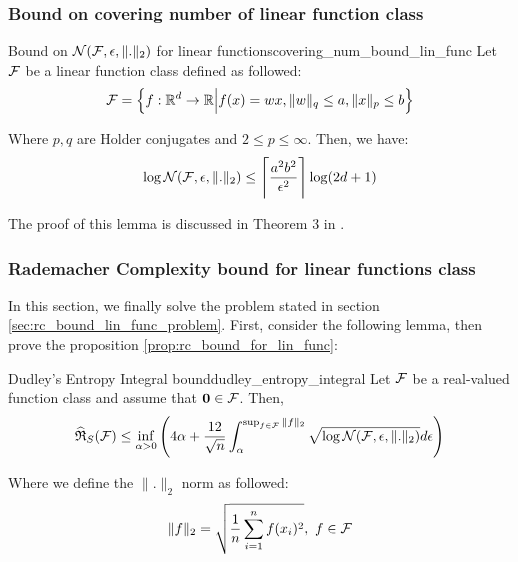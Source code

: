 \subsubsection{Bound on covering number of linear function class}
\begin{lemma}{Bound on $\mathcal{N}(\mathcal{F}, \epsilon, \|.\|_2)$ for linear functions}{covering_num_bound_lin_func}
    Let $\mathcal{F}$ be a linear function class defined as followed:
    \begin{align*}
        \mathcal{F} = \Big\{ 
            f:\mathbb{R}^d\to\mathbb{R} \Big| f(x) = wx, \|w\|_q \le a, \|x\|_p \le b
         \Big\}
    \end{align*}

    \noindent Where $p, q$ are Holder conjugates and $2\le p\le \infty$. Then, we have:
    \begin{align*}
        \log\mathcal{N}(\mathcal{F}, \epsilon, \|.\|_2) \le \Bigg\lceil \frac{a^2b^2}{\epsilon^2} \Bigg\rceil \log(2d+1)
    \end{align*}

    \noindent The proof of this lemma is discussed in Theorem 3 in \cite{article:tong_zhang}.
\end{lemma}

\begin{proof*}
    
\end{proof*}


\subsubsection{Rademacher Complexity bound for linear functions class}
In this section, we finally solve the problem stated in section \ref{sec:rc_bound_lin_func_problem}. First, consider the following lemma, then prove the proposition \ref{prop:rc_bound_for_lin_func}:

\begin{theorem}{Dudley's Entropy Integral bound}{dudley_entropy_integral}
    Let $\mathcal{F}$ be a real-valued function class and assume that ${\bf 0}\in\mathcal{F}$. Then,
    \begin{align*}
        \widehat{\mathfrak{R}}_S(\mathcal{F}) \le \inf_{\alpha>0} \Bigg( 
            4\alpha + \frac{12}{\sqrt n}\int_\alpha^{\sup_{f\in\mathcal{F}}\|f\|_2} \sqrt{
                \log\mathcal{N}(\mathcal{F}, \epsilon,\|.\|_2)
            }d\epsilon
         \Bigg)
    \end{align*}

    \noindent Where we define the $\|.\|_2$ norm as followed:
    \begin{align*}
        \|f\|_2 = \sqrt{
            \frac{1}{n}\sum_{i=1}^n f(x_i)^2
        }, \ f\in\mathcal{F}
    \end{align*}
\end{theorem}
\begin{proof*}
    
\end{proof*}


